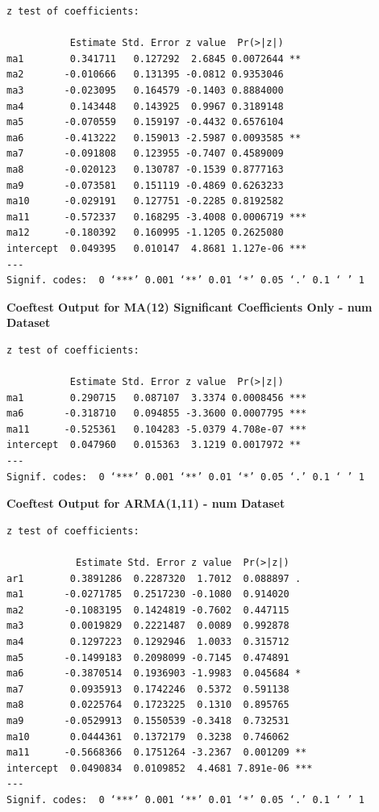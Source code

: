 \documentclass[a4paper]{article}
\begin{document}
\begin{verbatim}
z test of coefficients:

           Estimate Std. Error z value  Pr(>|z|)    
ma1        0.341711   0.127292  2.6845 0.0072644 ** 
ma2       -0.010666   0.131395 -0.0812 0.9353046    
ma3       -0.023095   0.164579 -0.1403 0.8884000    
ma4        0.143448   0.143925  0.9967 0.3189148    
ma5       -0.070559   0.159197 -0.4432 0.6576104    
ma6       -0.413222   0.159013 -2.5987 0.0093585 ** 
ma7       -0.091808   0.123955 -0.7407 0.4589009    
ma8       -0.020123   0.130787 -0.1539 0.8777163    
ma9       -0.073581   0.151119 -0.4869 0.6263233    
ma10      -0.029191   0.127751 -0.2285 0.8192582    
ma11      -0.572337   0.168295 -3.4008 0.0006719 ***
ma12      -0.180392   0.160995 -1.1205 0.2625080    
intercept  0.049395   0.010147  4.8681 1.127e-06 ***
---
Signif. codes:  0 ‘***’ 0.001 ‘**’ 0.01 ‘*’ 0.05 ‘.’ 0.1 ‘ ’ 1
\end{verbatim}

\textbf{Coeftest Output for MA(12) Significant Coefficients Only - num Dataset}

\begin{verbatim}
z test of coefficients:

           Estimate Std. Error z value  Pr(>|z|)    
ma1        0.290715   0.087107  3.3374 0.0008456 ***
ma6       -0.318710   0.094855 -3.3600 0.0007795 ***
ma11      -0.525361   0.104283 -5.0379 4.708e-07 ***
intercept  0.047960   0.015363  3.1219 0.0017972 ** 
---
Signif. codes:  0 ‘***’ 0.001 ‘**’ 0.01 ‘*’ 0.05 ‘.’ 0.1 ‘ ’ 1
\end{verbatim}

\textbf{Coeftest Output for ARMA(1,11) - num Dataset}

\begin{verbatim}
z test of coefficients:

            Estimate Std. Error z value  Pr(>|z|)  
ar1        0.3891286  0.2287320  1.7012  0.088897 .
ma1       -0.0271785  0.2517230 -0.1080  0.914020
ma2       -0.1083195  0.1424819 -0.7602  0.447115
ma3        0.0019829  0.2221487  0.0089  0.992878
ma4        0.1297223  0.1292946  1.0033  0.315712
ma5       -0.1499183  0.2098099 -0.7145  0.474891
ma6       -0.3870514  0.1936903 -1.9983  0.045684 *
ma7        0.0935913  0.1742246  0.5372  0.591138
ma8        0.0225764  0.1723225  0.1310  0.895765    
ma9       -0.0529913  0.1550539 -0.3418  0.732531    
ma10       0.0444361  0.1372179  0.3238  0.746062    
ma11      -0.5668366  0.1751264 -3.2367  0.001209 ** 
intercept  0.0490834  0.0109852  4.4681 7.891e-06 ***
---
Signif. codes:  0 ‘***’ 0.001 ‘**’ 0.01 ‘*’ 0.05 ‘.’ 0.1 ‘ ’ 1
\end{verbatim}
\end{document}
